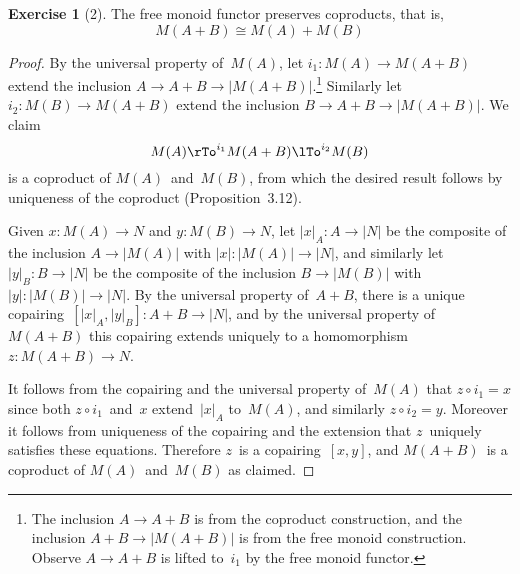 \documentclass[letterpaper,12pt]{article}
\newcommand{\iso}{\cong}
\newcommand{\after}{\circ}
\newcommand{\copair}[2]{[{#1},{#2}]}
\newcommand{\under}[1]{|{#1}|}
\theoremstyle{definition}
\newtheorem*{exer}{Exercise}
\theoremstyle{remark}
\theoremstyle{direction}
\begin{document}
\begin{exer}[2]
The free monoid functor preserves coproducts, that is,
\[M(A+B)\iso M(A)+M(B)\]
\end{exer}
\begin{proof}
By the universal property of~\(M(A)\), let \(i_1:M(A)\to M(A+B)\) extend the inclusion \(A\to A+B\to\under{M(A+B)}\).\footnote{The inclusion \(A\to A+B\) is from the coproduct construction, and the inclusion \(A+B\to\under{M(A+B)}\) is from the free monoid construction. Observe \(A\to A+B\) is lifted to~\(i_1\) by the free monoid functor.} Similarly let \(i_2:M(B)\to M(A+B)\) extend the inclusion \(B\to A+B\to\under{M(A+B)}\). We claim
\[M(A)\rTo^{i_1}M(A+B)\lTo^{i_2}M(B)\]
is a coproduct of \(M(A)\)~and~\(M(B)\), from which the desired result follows by uniqueness of the coproduct (Proposition~3.12).

Given \(x:M(A)\to N\) and \(y:M(B)\to N\), let \(\under{x}_A:A\to\under{N}\) be the composite of the inclusion \(A\to\under{M(A)}\) with \(\under{x}:\under{M(A)}\to\under{N}\), and similarly let \(\under{y}_B:B\to\under{N}\) be the composite of the inclusion \(B\to\under{M(B)}\) with \(\under{y}:\under{M(B)}\to\under{N}\). By the universal property of~\(A+B\), there is a unique copairing~\(\copair{\under{x}_A}{\under{y}_B}:A+B\to\under{N}\), and by the universal property of~\(M(A+B)\) this copairing extends uniquely to a homomorphism \(z:M(A+B)\to N\).

It follows from the copairing and the universal property of~\(M(A)\) that \(z\after i_1=x\) since both \(z\after i_1\)~and~\(x\) extend~\(\under{x}_A\) to~\(M(A)\), and similarly \(z\after i_2=y\). Moreover it follows from uniqueness of the copairing and the extension that \(z\)~uniquely satisfies these equations. Therefore \(z\)~is a copairing~\(\copair{x}{y}\), and \(M(A+B)\)~is a coproduct of \(M(A)\)~and~\(M(B)\) as claimed.
\end{proof}
\end{document}
